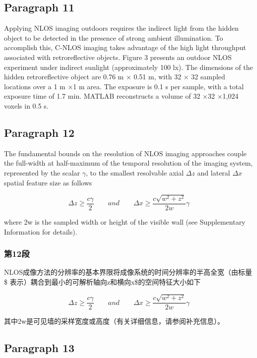 \documentclass[11pt]{article}
\begin{document}
    \subsection{Paragraph 11}\label{paragraph-11}

Applying NLOS imaging outdoors requires the indirect light from the
hidden object to be detected in the presence of strong ambient
illumination. To accomplish this, C-NLOS imaging takes advantage of the
high light throughput associated with retroreflective objects. Figure 3
presents an outdoor NLOS experiment under indirect sunlight
(approximately 100 lx). The dimensions of the hidden retroreflective
object are 0.76 m × 0.51 m, with 32 × 32 sampled locations over a 1 m ×1
m area. The exposure is 0.1 s per sample, with a total exposure time of
1.7 min. MATLAB reconstructs a volume of 32 ×32 ×1,024 voxels in 0.5 s.

    \subsection{Paragraph 12}\label{paragraph-12}

The fundamental bounds on the resolution of NLOS imaging approaches
couple the full-width at half-maximum of the temporal resolution of the
imaging system, represented by the scalar \(\gamma\), to the smallest
resolvable axial \(\Delta z\) and lateral \(\Delta x\) spatial feature
size as follows

\[\Delta z \geq \frac{c\gamma }{2} \qquad and \qquad \Delta x \geq \frac{c\sqrt{w^{2}+z^{2}}}{2w}\gamma\]

where 2w is the sampled width or height of the visible wall (see
Supplementary Information for details).

    \subsubsection{第12段}\label{ux7b2c12ux6bb5}

NLOS成像方法的分辨率的基本界限将成像系统的时间分辨率的半高全宽（由标量\$
\gamma\(表示）耦合到最小的可解析轴向\)\Delta z\(和横向\)\Delta x\$的空间特征大小如下

\[\Delta z \geq \frac{c\gamma }{2} \qquad and \qquad \Delta x \geq \frac{c\sqrt{w^{2}+z^{2}}}{2w}\gamma\]

其中2w是可见墙的采样宽度或高度（有关详细信息，请参阅补充信息）。

    \subsection{Paragraph 13}\label{paragraph-13}
\end{document}
